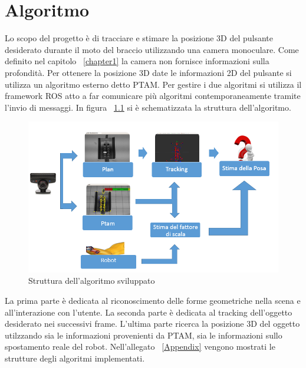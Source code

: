 \chapter{Algoritmo}
\label{chapter4}

Lo scopo del progetto è di tracciare e stimare la posizione 3D del pulsante desiderato durante il moto del braccio utilizzando una camera monoculare. 
Come definito nel capitolo ~\ref{chapter1} la camera non fornisce informazioni sulla profondità. Per ottenere la posizione 3D date le informazioni 2D del pulsante si utilizza un algoritmo esterno detto PTAM. 
Per gestire i due algoritmi si utilizza il framework ROS atto a far comunicare più algoritmi contemporaneamente tramite l'invio di messaggi. 
In figura ~\ref{fig:struttura} si è schematizzata la struttura dell'algoritmo.
\begin{figure}[H]
   \centering
   \includegraphics[width=0.9\columnwidth]{struttura.png} 
   \caption{Struttura dell'algoritmo sviluppato}
   \label{fig:struttura} 
\end{figure}
La prima parte è dedicata al riconoscimento delle forme geometriche nella scena e all'interazione con l'utente. La seconda parte è dedicata al tracking dell'oggetto desiderato nei successivi frame. L'ultima parte ricerca la posizione 3D del oggetto utilzzando sia le informazioni provenienti da PTAM, sia le informazioni sullo spostamento reale del robot. Nell'allegato ~\ref{Appendix} vengono mostrati le strutture degli algoritmi implementati.

